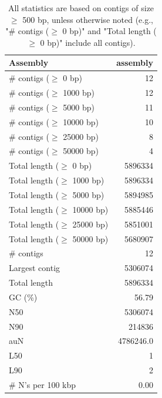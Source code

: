 \documentclass[12pt,a4paper]{article}
\begin{document}
\begin{table}[ht]
\begin{center}
\caption{All statistics are based on contigs of size $\geq$ 500 bp, unless otherwise noted (e.g., "\# contigs ($\geq$ 0 bp)" and "Total length ($\geq$ 0 bp)" include all contigs).}
\begin{tabular}{|l*{1}{|r}|}
\hline
Assembly & assembly \\ \hline
\# contigs ($\geq$ 0 bp) & 12 \\ \hline
\# contigs ($\geq$ 1000 bp) & 12 \\ \hline
\# contigs ($\geq$ 5000 bp) & 11 \\ \hline
\# contigs ($\geq$ 10000 bp) & 10 \\ \hline
\# contigs ($\geq$ 25000 bp) & 8 \\ \hline
\# contigs ($\geq$ 50000 bp) & 4 \\ \hline
Total length ($\geq$ 0 bp) & 5896334 \\ \hline
Total length ($\geq$ 1000 bp) & 5896334 \\ \hline
Total length ($\geq$ 5000 bp) & 5894985 \\ \hline
Total length ($\geq$ 10000 bp) & 5885446 \\ \hline
Total length ($\geq$ 25000 bp) & 5851001 \\ \hline
Total length ($\geq$ 50000 bp) & 5680907 \\ \hline
\# contigs & 12 \\ \hline
Largest contig & 5306074 \\ \hline
Total length & 5896334 \\ \hline
GC (\%) & 56.79 \\ \hline
N50 & 5306074 \\ \hline
N90 & 214836 \\ \hline
auN & 4786246.0 \\ \hline
L50 & 1 \\ \hline
L90 & 2 \\ \hline
\# N's per 100 kbp & 0.00 \\ \hline
\end{tabular}
\end{center}
\end{table}
\end{document}
